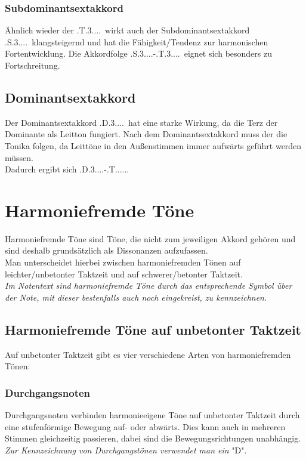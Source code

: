 \documentclass[a4paper]{article}
\newcommand{\T}{\HH.T.....}
\newcommand{\TS}{\HH.T.3....}
\renewcommand{\SS}{\HH.S.3....}
\newcommand{\DSe}{\HH.D.3....}
\begin{document}
	\subsubsection{Subdominantsextakkord}
	Ähnlich wieder der \TS\ wirkt auch der Subdominantsextakkord \SS\ klangsteigernd und hat die Fähigkeit/Tendenz zur harmonischen Fortentwicklung. Die Akkordfolge \SS-\TS\ eignet sich besonders zu Fortschreitung.
	
	\subsection{Dominantsextakkord}
	Der Dominantsextakkord \DSe\ hat eine starke Wirkung, da die Terz der Dominante als Leitton fungiert. Nach dem Dominantsextakkord muss der die Tonika folgen, da Leittöne in den Außenstimmen immer aufwärts geführt werden müssen.\\ Dadurch ergibt sich \DSe-\T.
	
	\section{Harmoniefremde Töne}
	Harmoniefremde Töne sind Töne, die nicht zum jeweiligen Akkord gehören und sind deshalb grundsätzlich als Dissonanzen aufzufassen.\\
	Man unterscheidet hierbei zwischen harmoniefremden Tönen auf leichter/unbetonter Taktzeit und auf schwerer/betonter Taktzeit.\\
	\textit{Im Notentext sind harmoniefremde Töne durch das entsprechende Symbol über der Note, mit dieser bestenfalls auch noch eingekreist, zu kennzeichnen.}
	
	\subsection{Harmoniefremde Töne auf unbetonter Taktzeit}
	Auf unbetonter Taktzeit gibt es vier verschiedene Arten von harmoniefremden Tönen:
	
	\subsubsection{Durchgangsnoten}
	Durchgangsnoten verbinden harmonieeigene Töne auf unbetonter Taktzeit durch eine stufenförmige Bewegung auf- oder abwärts. Dies kann auch in mehreren Stimmen gleichzeitig passieren, dabei  sind die Bewegungsrichtungen unabhängig.\\
	\textit{Zur Kennzeichnung von Durchgangstönen verwendet man ein} "D".
	
\end{document}
